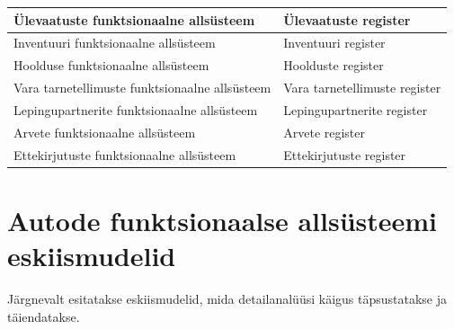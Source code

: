 \documentclass{report}
\begin{document}
\begin{table}[H]
\begin{tabular}{|l|l|}
		Ülevaatuste funktsionaalne allsüsteem                                            & Ülevaatuste register                                                                                                                                    \\ \hline
		Inventuuri funktsionaalne allsüsteem                                             & Inventuuri register                                                                                                                                     \\ \hline
		Hoolduse funktsionaalne allsüsteem                                               & Hoolduste register                                                                                                                                      \\ \hline
		Vara tarnetellimuste funktsionaalne allsüsteem                                   & Vara tarnetellimuste register                                                                                                                           \\ \hline
		Lepingupartnerite funktsionaalne allsüsteem                                      & Lepingupartnerite register                                                                                                                              \\ \hline
		Arvete funktsionaalne allsüsteem                                                 & Arvete register                                                                                                                                         \\ \hline
		Ettekirjutuste funktsionaalne allsüsteem                                         & Ettekirjutuste register                                                                                                                                 \\ \hline
	\end{tabular}
\end{table}

\newpage
\section{Autode funktsionaalse allsüsteemi eskiismudelid}
Järgnevalt esitatakse eskiismudelid, mida detailanalüüsi käigus täpsustatakse ja täiendatakse.
 
\end{document}
